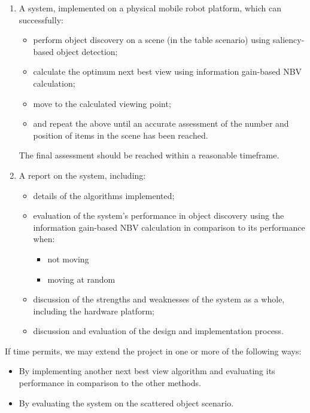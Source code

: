 \documentclass[a4paper,11pt,english]{article}
\begin{document}
\begin{enumerate}
	
	\item A system, implemented on a physical mobile robot platform, which can successfully:
	\begin{itemize}
		\item perform object discovery on a scene (in the table scenario) using saliency-based object detection;
		\item calculate the optimum next best view using information gain-based NBV calculation;
		\item move to the calculated viewing point;
		\item and repeat the above until an accurate assessment of the number and position of items in the scene has been reached.
	\end{itemize}
	The final assessment should be reached within a reasonable timeframe.

	\item A report on the system, including:
	\begin{itemize}
		\item details of the algorithms implemented;
		\item evaluation of the system's performance in object discovery using the information gain-based NBV calculation in comparison to its performance when:
		\begin{itemize}
			\item not moving
			\item moving at random
		\end{itemize}
		\item discussion of the strengths and weaknesses of the system as a whole, including the hardware platform;
		\item discussion and evaluation of the design and implementation process.
	\end{itemize}

\end{enumerate}

If time permits, we may extend the project in one or more of the following ways:

\begin{itemize}
	\item By implementing another next best view algorithm and evaluating its performance in comparison to the other methods.
	\item By evaluating the system on the scattered object scenario.
\end{itemize}


\newpage


\end{document}
